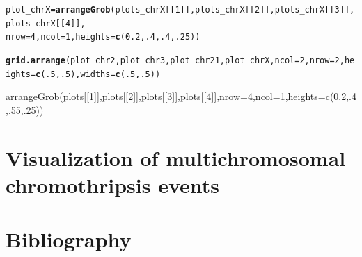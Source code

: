 \documentclass[twoside,a4wide,11pt]{article}\usepackage[]{graphicx}\usepackage[]{color}
\makeatletter
\newcommand{\hlnum}[1]{\textcolor[rgb]{0.686,0.059,0.569}{#1}}%
\newcommand{\hlstd}[1]{\textcolor[rgb]{0.345,0.345,0.345}{#1}}%
\newcommand{\hlkwb}[1]{\textcolor[rgb]{0.69,0.353,0.396}{#1}}%
\newcommand{\hlkwc}[1]{\textcolor[rgb]{0.333,0.667,0.333}{#1}}%
\newcommand{\hlkwd}[1]{\textcolor[rgb]{0.737,0.353,0.396}{\textbf{#1}}}%
\newenvironment{kframe}{%
 \def\at@end@of@kframe{}%
 \ifinner\ifhmode%
  \def\at@end@of@kframe{\end{minipage}}%
  \begin{minipage}{\columnwidth}%
 \fi\fi%
 \def\FrameCommand##1{\hskip\@totalleftmargin \hskip-\fboxsep
 \colorbox{shadecolor}{##1}\hskip-\fboxsep
     \hskip-\linewidth \hskip-\@totalleftmargin \hskip\columnwidth}%
 \MakeFramed {\advance\hsize-\width
   \@totalleftmargin\z@ \linewidth\hsize
   \@setminipage}}%
 {\par\unskip\endMakeFramed%
 \at@end@of@kframe}
\newenvironment{knitrout}{}{} %
\makeatother
\begin{document}
\begin{knitrout}
\begin{kframe}
{\ttfamily\noindent\bfseries\color{errorcolor}{\#\# Error: evaluation nested too deeply: infinite recursion / options(expressions=)?}}\begin{alltt}
\hlstd{plot_chrX} \hlkwb{=} \hlkwd{arrangeGrob}\hlstd{(plots_chrX[[}\hlnum{1}\hlstd{]],plots_chrX[[}\hlnum{2}\hlstd{]],plots_chrX[[}\hlnum{3}\hlstd{]],plots_chrX[[}\hlnum{4}\hlstd{]],}
                        \hlkwc{nrow}\hlstd{=}\hlnum{4}\hlstd{,}\hlkwc{ncol}\hlstd{=}\hlnum{1}\hlstd{,}\hlkwc{heights}\hlstd{=}\hlkwd{c}\hlstd{(}\hlnum{0.2}\hlstd{,}\hlnum{.4}\hlstd{,}\hlnum{.4}\hlstd{,}\hlnum{.25}\hlstd{))}
\end{alltt}


{\ttfamily\noindent\bfseries\color{errorcolor}{\#\# Error in arrangeGrob(plots\_chrX[[1]], plots\_chrX[[2]], plots\_chrX[[3]], : object 'plots\_chrX' not found}}\begin{alltt}
\hlkwd{grid.arrange}\hlstd{(plot_chr2,plot_chr3,plot_chr21,plot_chrX,}\hlkwc{ncol}\hlstd{=}\hlnum{2}\hlstd{,}\hlkwc{nrow}\hlstd{=}\hlnum{2}\hlstd{,}\hlkwc{heights}\hlstd{=}\hlkwd{c}\hlstd{(}\hlnum{.5}\hlstd{,}\hlnum{.5}\hlstd{),}\hlkwc{widths}\hlstd{=}\hlkwd{c}\hlstd{(}\hlnum{.5}\hlstd{,}\hlnum{.5}\hlstd{))}
\end{alltt}


{\ttfamily\noindent\bfseries\color{errorcolor}{\#\# Error in arrangeGrob(...): object 'plot\_chrX' not found}}\end{kframe}
\end{knitrout}


arrangeGrob(plots[[1]],plots[[2]],plots[[3]],plots[[4]],nrow=4,ncol=1,heights=c(0.2,.4,.55,.25))

\section{Visualization of multichromosomal chromothripsis events}


\section{Bibliography}
\printbibliography
\end{document}
